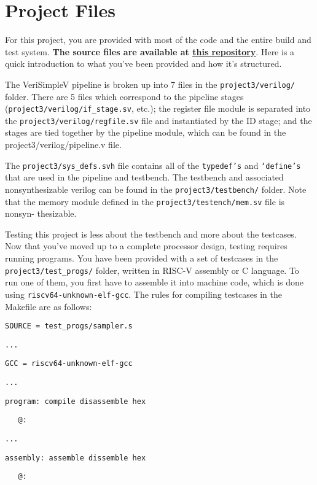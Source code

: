 \documentclass{article}
\begin{document}
\section{Project Files}
For this project, you are provided with most of the code and the entire build and test system. \textbf{The source files are available at \href{https://bitbucket.org/jieltan/project-v-open-beta/src/master/}{\underline{this repository}}}. Here is a quick introduction to what you've been provided and how it's structured.

The VeriSimpleV pipeline is broken up into 7 files in the \texttt{project3/verilog/ }folder. There are 5 files which correspond to the pipeline stages (\texttt{project3/verilog/if\_stage.sv}, etc.); the register file module is separated into the \texttt{project3/verilog/regfile.sv} file and instantiated by the ID stage; and the stages are tied together by the pipeline module, which can be found in the project3/verilog/pipeline.v file.

The \texttt{project3/sys\_defs.svh} file contains all of the \texttt{typedef's} and \texttt{`define's} that are used in the pipeline and testbench. The testbench and associated nonsynthesizable verilog can be found in the \texttt{project3/testbench/} folder. Note that the memory module defined in the \texttt{project3/testench/mem.sv} file is nonsyn- thesizable.

Testing this project is less about the testbench and more about the testcases. Now that you've moved up to a complete processor design, testing requires running programs. You have been provided with a set of testcases in the \texttt{project3/test\_progs/} folder, written in RISC-V assembly or C language. To run one of them, you first have to assemble it into machine code, which is done using  \texttt{riscv64-unknown-elf-gcc}. The rules for compiling testcases in the Makefile are as follows:

\hrulefill

\texttt{SOURCE = test\_progs/sampler.s}

\texttt{...}

\texttt{GCC = riscv64-unknown-elf-gcc}

\texttt{...}

\texttt{program: compile disassemble hex}

\texttt{~~~@:}

\texttt{...}

\texttt{assembly: assemble dissemble hex}

\texttt{~~~@:}
\end{document}
